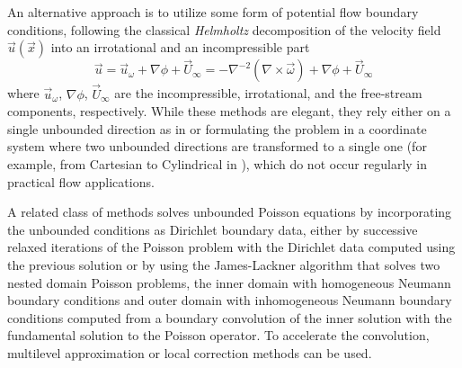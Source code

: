 \documentclass[11pt]{article}
\begin{document}
An alternative approach is to utilize some form of potential flow boundary conditions, following the classical \emph{Helmholtz} decomposition of the velocity field $\vec u(\vec x)$ into an irrotational and an incompressible part
\begin{equation}\label{eq:u_vort}
    \vec{u} = \vec{u}_\omega + \nabla\phi + \vec{U}_\infty = -\nabla^{-2}\left(\nabla \times \vec{\omega}\right) + \nabla\phi + \vec{U}_\infty
\end{equation}
where $\vec{u}_\omega$, $\nabla\phi$, $\vec{U}_\infty$ are the incompressible, irrotational, and the free-stream components, respectively. While these methods are elegant, they rely either on a single unbounded direction as in \cite{Grosch1977NumericalTransforms} or formulating the problem in a coordinate system where two unbounded directions are transformed to a single one (for example, from Cartesian to Cylindrical in \cite{Levy2022SolvingMethod}), which do not occur regularly in practical flow applications.

A related class of methods solves unbounded Poisson equations by incorporating the unbounded conditions as Dirichlet boundary data, either by successive relaxed iterations of the Poisson problem with the Dirichlet data computed using the previous solution \cite{Miller2008AnBoundaries} or by using the James-Lackner \cite{Jamb1977TheDistributions, Lackner1976ComputationEquilibria} algorithm that solves two nested domain Poisson problems, the inner domain with homogeneous Neumann boundary conditions and outer domain with inhomogeneous Neumann boundary conditions computed from a boundary convolution of the inner solution with the fundamental solution to the Poisson operator. To accelerate the convolution, multilevel approximation \cite{Mccorquodale2006ADimensions} or local correction methods \cite{Kavouklis2019ComputationCorrections} can be used.
\end{document}
